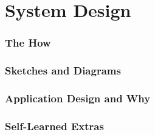 \chapter{System Design}

\subsection{The How}

\subsection{Sketches and Diagrams}

\subsection{Application Design and Why}

\subsection{Self-Learned Extras}